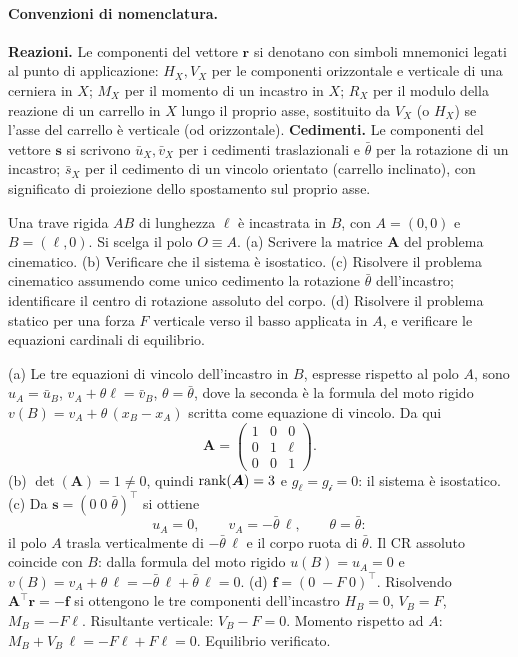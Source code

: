 \paragraph*{Convenzioni di nomenclatura.}
\textbf{Reazioni.} Le componenti del vettore $\bm{r}$ si
denotano con simboli mnemonici legati al punto di applicazione:
$H_X, V_X$ per le componenti orizzontale e verticale di una
cerniera in $X$; $M_X$ per il momento di un incastro in $X$;
$R_X$ per il modulo della reazione di un carrello in $X$ lungo
il proprio asse, sostituito da $V_X$ (o $H_X$) se l'asse del
carrello è verticale (od orizzontale).
\textbf{Cedimenti.} Le componenti del vettore $\bm{s}$ si
scrivono $\bar{u}_X, \bar{v}_X$ per i cedimenti traslazionali e
$\bar{\theta}$ per la rotazione di un incastro; $\bar{s}_X$ per
il cedimento di un vincolo orientato (carrello inclinato), con
significato di proiezione dello spostamento sul proprio asse.



\begin{esercizio}
	\label{ex:C05_mensola}
	
	Una trave rigida $AB$ di lunghezza $\ell$ è incastrata in $B$,
	con $A=(0,0)$ e $B=(\ell,0)$. Si scelga il polo $O\equiv A$.
	(a) Scrivere la matrice $\bm{A}$ del problema cinematico.
	(b) Verificare che il sistema è isostatico.
	(c) Risolvere il problema cinematico assumendo come unico
	cedimento la rotazione $\bar{\theta}$ dell'incastro;
	identificare il centro di rotazione assoluto del corpo.
	(d) Risolvere il problema statico per una forza $F$ verticale
	verso il basso applicata in $A$, e verificare le equazioni
	cardinali di equilibrio.
	
	\risultato (a) Le tre equazioni di vincolo dell'incastro in
	$B$, espresse rispetto al polo $A$, sono $u_A=\bar{u}_B$,
	$v_A+\theta\ell=\bar{v}_B$, $\theta=\bar{\theta}$, dove la
	seconda è la formula del moto rigido $v(B)=v_A+\theta\,(x_B-x_A)$
	scritta come equazione di vincolo. Da qui
	\[
	\bm{A}=
	\begin{pmatrix}
		1 & 0 & 0\\
		0 & 1 & \ell\\
		0 & 0 & 1
	\end{pmatrix}.
	\]
	(b) $\det(\bm{A})=1\neq 0$, quindi $\operatorname{rank}(\bm{A})=3$ e
	$g_\ell=g_{\mathscr{i}}=0$: il sistema è isostatico.
	(c) Da $\bm{s}=(0\;0\;\bar{\theta})^\top$ si ottiene
	\[
	u_A=0,\qquad v_A=-\bar{\theta}\,\ell,\qquad \theta=\bar{\theta}:
	\]
	il polo $A$ trasla verticalmente di $-\bar{\theta}\,\ell$ e
	il corpo ruota di $\bar{\theta}$. Il CR assoluto coincide
	con $B$: dalla formula del moto rigido
	$u(B)=u_A=0$ e
	$v(B)=v_A+\theta\,\ell=-\bar{\theta}\,\ell+\bar{\theta}\,\ell=0$.
	(d) $\bm{f}=(0\;-F\;0)^\top$. Risolvendo
	$\bm{A}^\top\bm{r}=-\bm{f}$ si ottengono le tre componenti
	dell'incastro $H_B=0$, $V_B=F$, $M_B=-F\ell$. Risultante
	verticale: $V_B-F=0$. Momento rispetto ad $A$:
	$M_B+V_B\,\ell=-F\ell+F\ell=0$. Equilibrio verificato.
\end{esercizio}

